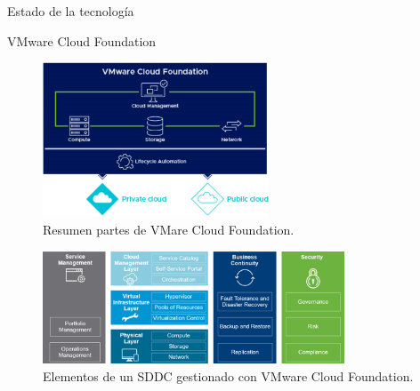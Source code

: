 \begin{section}{Estado de la tecnología}
\begin{subsection}{VMware Cloud Foundation}
\begin{itemize}
\end{itemize}
\begin{figure}[h!]
    \centering
    \includegraphics[width=0.6\textwidth]{imaxes/cap2recursos/overviewCF.png}
            \caption{Resumen partes de VMare Cloud Foundation.}
    \label{fig:Cloud-Foundation-Overview}
    \end{figure}
    \FloatBarrier
    \begin{figure}[h]
        \centering
        \includegraphics[width=0.8\textwidth]{imaxes/cap2recursos/SDDCoverview.png}
        \caption{Elementos de un SDDC gestionado con VMware Cloud Foundation.}
        \label{fig:layers-Sddc}
    \end{figure}
    \FloatBarrier


\end{subsection}
\end{section}
